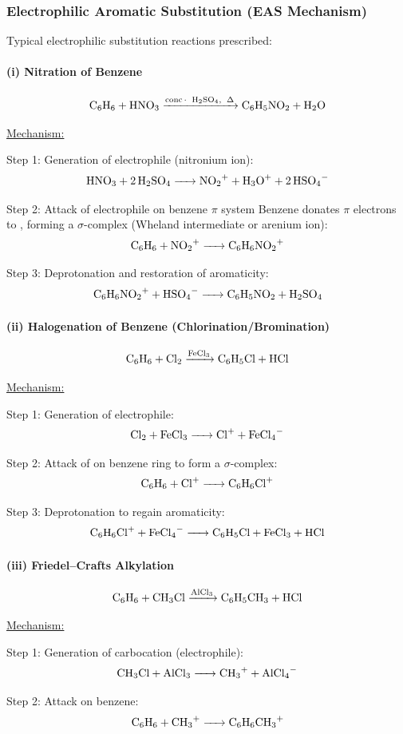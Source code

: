 \documentclass[12pt,a4paper]{article}
\begin{document}
\subsubsection{Electrophilic Aromatic Substitution (EAS Mechanism)}

Typical electrophilic substitution reactions prescribed:

\paragraph{(i) Nitration of Benzene}
\[
\ce{C6H6 + HNO3 ->[conc.\ H2SO4,\ \Delta] C6H5NO2 + H2O}
\]

\underline{Mechanism:}

Step 1: Generation of electrophile (nitronium ion):
\[
\ce{HNO3 + 2H2SO4 -> NO2^+ + H3O^+ + 2HSO4^-}
\]

Step 2: Attack of electrophile on benzene $\pi$ system  
Benzene donates $\pi$ electrons to , forming a $\sigma$-complex (Wheland intermediate or arenium ion):
\[
\ce{C6H6 + NO2^+ -> C6H6NO2^+}
\]

Step 3: Deprotonation and restoration of aromaticity:
\[
\ce{C6H6NO2^+ + HSO4^- -> C6H5NO2 + H2SO4}
\]

\paragraph{(ii) Halogenation of Benzene (Chlorination/Bromination)}
\[
\ce{C6H6 + Cl2 ->[FeCl3] C6H5Cl + HCl}
\]

\underline{Mechanism:}

Step 1: Generation of electrophile:
\[
\ce{Cl2 + FeCl3 -> Cl^+ + FeCl4^-}
\]

Step 2: Attack of  on benzene ring to form a $\sigma$-complex:
\[
\ce{C6H6 + Cl^+ -> C6H6Cl^+}
\]

Step 3: Deprotonation to regain aromaticity:
\[
\ce{C6H6Cl^+ + FeCl4^- -> C6H5Cl + FeCl3 + HCl}
\]

\paragraph{(iii) Friedel–Crafts Alkylation}
\[
\ce{C6H6 + CH3Cl ->[AlCl3] C6H5CH3 + HCl}
\]

\underline{Mechanism:}

Step 1: Generation of carbocation (electrophile):
\[
\ce{CH3Cl + AlCl3 -> CH3^+ + AlCl4^-}
\]

Step 2: Attack on benzene:
\[
\ce{C6H6 + CH3^+ -> C6H6CH3^+}
\]
\end{document}
